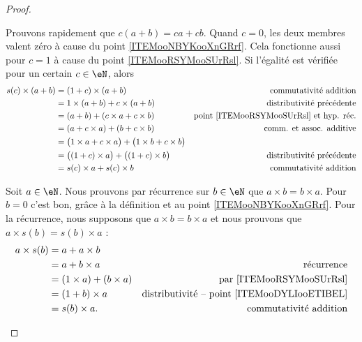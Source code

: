 \begin{proof}
\begin{subproof}
		Prouvons rapidement que \( c(a+b) = ca + cb \). Quand \( c = 0 \), les deux membres valent zéro à cause du point \ref{ITEMooNBYKooXnGRrf}. Cela fonctionne aussi pour \( c = 1 \) à cause du point \ref{ITEMooRSYMooSUrRsl}. Si l'égalité est vérifiée pour un certain \( c \in \eN \), alors
  		\begin{align}
			s(c) \times (a+b)& = (1+c) \times (a+b)                                         &\text{commutativité addition}                        \\
			                 & = 1 \times (a+b) + c \times(a+b)                             &\text{distributivité précédente}                     \\
			                 & = (a + b) + (c \times a + c \times b)                        &\text{point \ref{ITEMooRSYMooSUrRsl} et hyp. réc.}   \\
			                 & = (a + c \times a) + (b + c \times b)                        &\text{comm. et assoc. additive}                      \\
							 & =\big( 1 \times a + c \times a \big)+\big( 1 \times b + c \times b \big)                                           \\
							 & =\big( (1 + c) \times a \big)+\big( (1 + c) \times b \big)   &\text{distributivité précédente}                     \\
							 & = s(c) \times a + s(c) \times b                              &\text{commutativité addition}                        
		\end{align}
  
		Soit \( a\in \eN\). Nous prouvons par récurrence sur \( b\in \eN\) que \( a\times b=b\times a\). Pour \( b=0\) c'est bon, grâce à la définition et au point \ref{ITEMooNBYKooXnGRrf}. Pour la récurrence, nous supposons que \( a\times b=b\times a\) et nous prouvons que \( a\times s(b)=s(b)\times a\) :
		\begin{subequations}
			\begin{align}
				a\times s(b) & = a + a\times b                                                                       \\
				             & = a + b\times a             & \text{récurrence}                                       \\
				             & =(1\times a) + (b\times a)  & \text{par \ref{ITEMooRSYMooSUrRsl}}                     \\
				             & =(1 + b)\times a            & \text{distributivité -- point \ref{ITEMooDYLIooETIBEL}} \\
				             & =s(b)\times a.              & \text{commutativité addition}                           \\
			\end{align}
		\end{subequations}


\end{subproof}
\end{proof}
